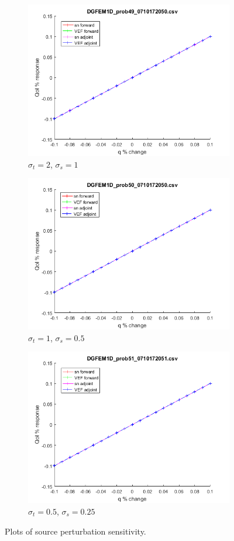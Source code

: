 \documentclass{article}
\newcommand{\sigt}{\sigma_t}
\newcommand{\sigs}{\sigma_s}
\begin{document}
\begin{figure}[H]
\label{InHomoPertq}
\centering
\begin{subfigure}{.5\textwidth}
  \centering
  \includegraphics[width=.8\linewidth]{figures/49qSens.png}
  \caption{$\sigt=2$, $\sigs=1$}
  \label{fig:sfig1}
\end{subfigure}%
\begin{subfigure}{.5\textwidth}
  \centering
  \includegraphics[width=.8\linewidth]{figures/50qSens.png}
  \caption{$\sigt=1$, $\sigs=0.5$}
  \label{fig:sfig2}
\end{subfigure}
\begin{subfigure}{.5\textwidth}
  \centering
  \includegraphics[width=.8\linewidth]{figures/51qSens.png}
  \caption{$\sigt=0.5$, $\sigs=0.25$}
  \label{fig:sfig3}
\end{subfigure}
\caption{Plots of source perturbation sensitivity.}
\label{fig:fig}
\end{figure}
\end{document}
